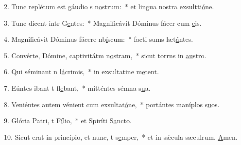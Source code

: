 2. Tunc replétum est gáudio s n\uline{o}strum:~* et lingua nostra exsultti\uline{ó}ne.\par 
3. Tunc dicent intr G\uline{e}ntes:~* Magnificávit Dóminus fácer cum \uline{e}is.\par 
4. Magnificávit Dóminus fácere nb\uline{í}scum:~* facti sums læt\uline{á}ntes.\par 
5. Convérte, Dómine, captivitátm n\uline{o}stram,~* sicut torrns in \uline{au}stro.\par 
6. Qui séminant n l\uline{á}crimis,~* in exsultatine m\uline{e}tent.\par 
7. Eúntes ibant t fl\uline{e}bant,~* mitténtes sémna s\uline{u}a.\par 
8. Veniéntes autem vénient cum exsultat\uline{ó}ne,~* portántes maníplos s\uline{u}os.\par 
9. Glória Patri, t F\uline{í}lio,~* et Spiríti S\uline{a}ncto.\par 
10. Sicut erat in princípio, et nunc, t s\uline{e}mper,~* et in sǽcula sæculrum. \uline{A}men.\par 
